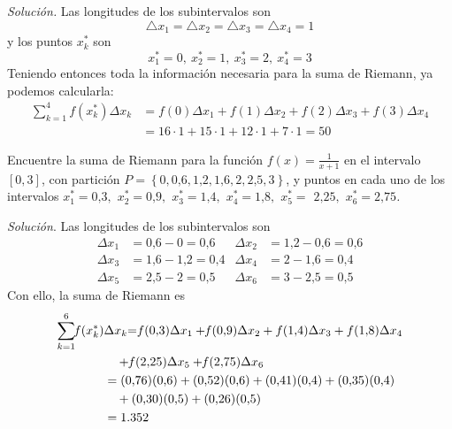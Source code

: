 \textit{Solución.} Las longitudes de los subintervalos son
\[
\bigtriangleup x_{1}=\bigtriangleup x_{2}=\bigtriangleup
x_{3}=\bigtriangleup x_{4}=1
\]
y los puntos $x_k^*$ son
\[
x_{1}^{\ast }=0,\ x_{2}^{\ast }=1,\ x_{3}^{\ast }=2,\ x_{4}^{\ast }=3
\]
Teniendo entonces toda la información necesaria para la suma de Riemann, ya podemos calcularla:
\begin{align*}
\sum_{k=1}^{4}f(x_{k}^{\ast })\Delta x_{k}&=f(0)\Delta x_{1}+f(1)\Delta x_{2}+f(2)\Delta x_{3}+f(3)\Delta x_{4}\\
&=16\cdot 1+15\cdot 1+12\cdot 1+7\cdot1=50 
\end{align*}

\begin{ejemplo}
Encuentre la suma de Riemann para la función \textit{$f(x)=\frac{1}{x+1}$} en
el intervalo $\left[ 0,3\right] $, con partición \textit{$P=\left\{0,0\text{,}6,1\text{,}2,1\text{,}6,2,2\text{,}5,3\right\}$}, y puntos en cada uno de los intervalos \textit{$x_{1}^{\ast }=0\text{,}3,$ $x_{2}^{\ast }=0\text{,}9,$ $x_{3}^{\ast }=1\text{,}4,$ $x_{4}^{\ast}=1\text{,}8,$ $x_{5}^{\ast }=$ $2\text{,}25,$ $x_{6}^{\ast }=2\text{,}75$.}
\end{ejemplo}

\textit{Solución}. Las longitudes de los subintervalos son
\begin{align*}
\Delta x_{1}&=0\text{,}6-0=0\text{,}6 &
\Delta x_{2}&=1\text{,}2-0\text{,}6=0\text{,}6\\
\Delta x_{3}&=1\text{,}6-1\text{,}2=0\text{,}4&
\Delta x_{4}&=2-1\text{,}6=0\text{,}4 \\
\Delta x_{5}&=2\text{,}5-2=0\text{,}5&
\Delta x_{6}&=3-2\text{,}5=0\text{,}5
\end{align*}
Con ello, la suma de Riemann es
{\small
\begin{align*}
\sum_{k=1}^{6}\hspace{-0.1cm}f(x_{k}^{\ast })&\Delta x_{k}\hspace{-0.1cm}=\hspace{-0.1cm}f(0\text{,}3)\Delta
x_{1}+\hspace{-0.1cm}f(0\text{,}9)\Delta x_{2}+f(1\text{,}4)\Delta
x_{3}+f(1\text{,}8)\Delta x_{4}\\&\quad
+\hspace{-0.1cm}f(2\text{,}25)\Delta
x_{5}+\hspace{-0.1cm}f(2\text{,}75)\Delta x_{6}\\
&=(0\text{,}76)(0\text{,}6)+(0\text{,}52)(0\text{,}6)+(0\text{,}41)(0\text{,}4)+(0\text{,}35)(0\text{,}4)\\&\quad
+(0\text{,}30)(0\text{,}5)+(0\text{,}26)(0\text{,}5)\\
&=1\text{.}352
\end{align*}
}


